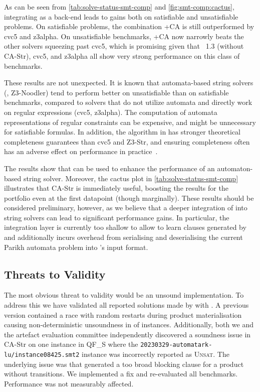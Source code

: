 As can be seen from \cref{tab:solve-status-smt-comp} and \cref{fig:smt-comp:cactus},
integrating \Catra{} as a back-end
leads to gains both on satisfiable and unsatisfiable problems. On
satisfiable problems, the combination \Ostrich+CA is still
outperformed by cvc5 and z3alpha. On unsatisfiable benchmarks,
\Ostrich+CA now narrowly beats the other solvers squeezing past cvc5,
which is promising given that \Ostrich{}~1.3 (without CA-Str), cvc5, and z3alpha all show very strong
performance on this class of benchmarks.

These results are not unexpected. It is known that automata-based string solvers (\Ostrich{}, Z3-Noodler) 
tend to perform better on unsatisfiable than on satisfiable benchmarks, compared to solvers
that do not utilize automata and directly work on regular expressions (cvc5, z3alpha).
The computation of automata representations of regular 
constraints can be expensive, and might be unnecessary for satisfiable formulas.
In addition, the algorithm in \Ostrich{} has stronger theoretical completeness
guarantees than cvc5 and Z3-Str, and ensuring completeness often has an adverse
effect on performance in practice~\cite{ostrich,Z3-str,cvc5}.

The results show that \Calculus{} can be used to enhance the performance of an
automaton-based string solver. Moreover, the cactus plot in \cref{tab:solve-status-smt-comp} 
illustrates that
CA-Str is immediately useful, boosting the results for the \Ostrich{} portfolio
even at the first datapoint (though marginally). These results should be considered preliminary,
however, as we believe that a deeper integration of \Catra{} into string solvers
can lead to significant performance gains. In particular, the integration layer 
is currently too shallow to allow \Ostrich{} to learn clauses generated by \Catra{}
and additionally incurs overhead from serialising and deserialising the current Parikh
automata problem into \Catra{}'s input format.

\subsection{Threats to Validity}

The most obvious threat to validity would be an unsound implementation. To
address this we have validated all reported solutions made by \Calculus{} with
\Nuxmv{}. A previous version contained a race with random restarts during
product materialisation causing non-deterministic unsoundness in 
of instances. Additionally, both we and the artefact evaluation committee independently
discovered a soundness issue in CA-Str on one instance in QF\_S where the 
\texttt{20230329-automatark-lu\slash{}instance08425.smt2} instance was
incorrectly reported as \textsc{Unsat}. The underlying issue was that \Catra{} generated
a too broad blocking clause for a product without transitions. We implemented a fix
and re-evaluated all benchmarks. Performance was not measurably affected.

